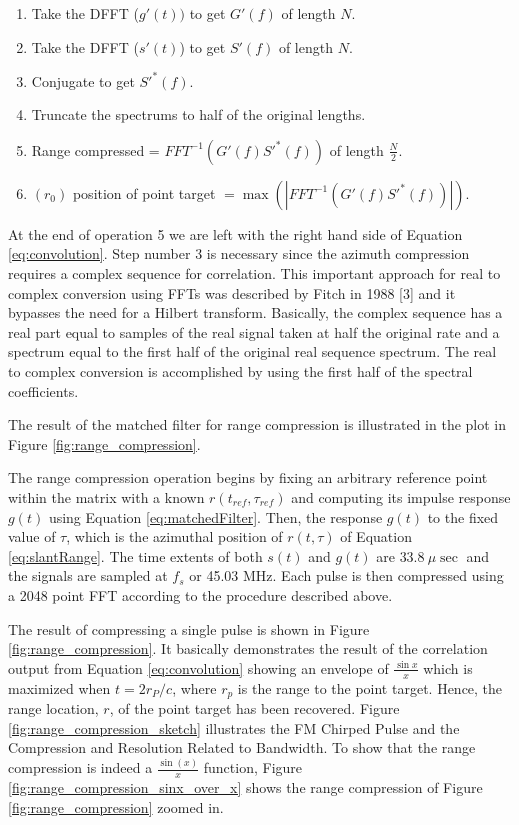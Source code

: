 \begin{enumerate}
\item Take the DFFT ($g'(t)) $ to get $G'(f)$ of length $N$.
\item Take the DFFT ($s'(t)$) to get $S'(f)$ of length $N$. 
\item Conjugate to get $S'^*(f)$.
\item Truncate the spectrums to half of the original lengths.
\item Range compressed = $FFT^{-1} \left (  G'(f) S'^*(f) \right )$ of length $\frac{N}{2}$.
\item $(r_0)$ position of point target $= \max ( | FFT^{-1} \left ( G'(f) S'^*(f) \right ) | ) $.
\end{enumerate}

At the end of operation 5 we are left with the right hand side of  Equation \ref{eq:convolution}. Step number 3 is necessary since the azimuth compression requires a complex sequence for correlation. This important approach for real to complex conversion using FFTs was described by Fitch in 1988 [3] and it bypasses the need for a Hilbert transform. Basically, the complex sequence has a real part equal to samples of the real signal taken at half the original rate and a spectrum equal to the first half of the original real sequence spectrum. The real to complex conversion is accomplished by using the first half of the spectral coefficients.

\par

The result of the matched filter for range compression is illustrated in the plot in Figure \ref{fig:range_compression}.

\par 


The range compression operation begins by fixing an arbitrary reference point within the matrix with a known $r(t_{ref},\tau_{ref} )$ and computing its impulse response $g(t)$ using Equation \ref{eq:matchedFilter}. Then, the response $g(t)$ to the fixed value of $\tau$, which is the azimuthal position of $r(t,\tau)$ of Equation \ref{eq:slantRange}. The time extents of both $s(t)$ and $g(t)$ are $33.8~\mu \sec $ and the signals are sampled at $f_s$ or 45.03 MHz. Each pulse is then compressed using a 2048 point FFT according to the procedure described above.


\par

The result of compressing a single pulse is shown in Figure \ref{fig:range_compression}. It basically demonstrates the result of the correlation output from Equation  \ref{eq:convolution} showing an envelope of $\frac{\sin x}{x}$ which is maximized when $t=2r_P/c$, where $r_p$ is the range to the point target. Hence, the range location, $r$, of the point target has been recovered. 
Figure \ref{fig:range_compression_sketch} illustrates the FM Chirped Pulse and the Compression and Resolution Related to Bandwidth. To show  that the range compression is indeed a $\frac{\sin(x)}{x}$ function, Figure \ref{fig:range_compression_sinx_over_x}  shows the range compression of Figure \ref{fig:range_compression} zoomed in.

